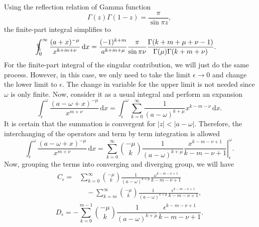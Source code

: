 Using the reflection relation of Gamma function \cite[p. 58-59]{hardy1940ramaniyan}
\begin{equation}
    \Gamma(z)\Gamma(1-z) = \frac{\pi}{\sin{\pi z}},
\end{equation}
the finite-part integral simplifies to
\begin{align}
\begin{split} 
    \bbint{0}{\infty} \frac{(a+x)^{-\mu}}{x^{k+m+\nu}} \, \mathrm{d}x &  = \frac{(-1)^{k+m}}{a^{k+m+\mu}} \frac{\pi}{\sin{\pi\nu}} \frac{\Gamma(k+m+\mu+\nu-1)}{\Gamma(\mu) \Gamma(k+m+\nu)}.
\end{split}
\end{align}
For the finite-part integral of the singular contribution, we will just do the same process. However, in this case, we only need to take the limit $\epsilon \to 0$ and change the lower limit to $\epsilon$. The change in variable for the upper limit is not needed since $\omega$ is only finite. Now, consider it as a usual integral and perform an expansion
\begin{equation}
    \int_{\epsilon}^{\omega} \frac{(a-\omega+x)^{-\mu}}{x^{m+\nu}} \, \mathrm{d}x = \int_{\epsilon}^{\omega} \sum_{k=0}^{\infty} \frac{1}{(a-\omega)^{k+\mu}} x^{k-m-\nu} \, \mathrm{d}x.
\end{equation}
It is certain that the summation is convergent for $|z| < |a-\omega|$. Therefore, the interchanging of the operators and term by term integration is allowed
\begin{equation}
    \int_{\epsilon}^{\omega} \frac{(a-\omega+x)^{-\mu}}{x^{m+\nu}} \, \mathrm{d}x = \sum_{k=0}^{\infty} \binom{-\mu}{k} \frac{1}{(a-\omega)^{k+\mu}} \left.  \frac{x^{k-m-\nu+1}}{k-m-\nu+1} \right|_{\epsilon}^{\omega}.
\end{equation}
Now, grouping the terms into converging and diverging group, we will have
\begin{align}
\begin{split} 
    C_\epsilon = & \sum_{k=0}^{\infty} \binom{-\mu}{k} \frac{1}{(a-\omega)^{k+\mu}} \frac{\omega^{k-m-\nu+1}}{k-m-\nu+1} \\& \quad -  \sum_{k=m}^{\infty} \binom{-\mu}{k} \frac{1}{(a-\omega)^{k+\mu}} \frac{\epsilon^{k-m-\nu+1}}{k-m-\nu+1},
\end{split}
\end{align}
\begin{equation}
    D_\epsilon = -\sum_{k=0}^{m-1} \binom{-\mu}{k} \frac{1}{(a-\omega)^{k+\mu}}  \frac{\epsilon^{k-m-\nu+1}}{k-m-\nu+1}. 
\end{equation}
